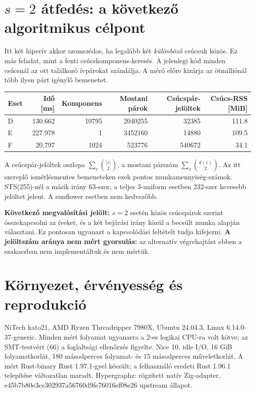 \documentclass[10pt,a4paper]{article}
\begin{document}
\section*{$s=2$ átfedés: a következő algoritmikus célpont}
Itt két hiperív akkor szomszédos, ha legalább két \emph{különböző} csúcsuk közös.
Ez más feladat, mint a fenti csúcskomponens-keresés. A jelenlegi kód minden csúcsnál
az ott találkozó ívpárokat számlálja. A mérő előre kizárja az ötmilliónál több ilyen
párt igénylő bemenetet.
\begin{center}\begin{tabular}{lrrrrr}\toprule
Eset & Idő [ms] & Komponens & Mostani párok & Csúcspár-jelöltek & Csúcs-RSS [MiB]\\\midrule
D & 130.662 & 10795 & 2040255 & 32385 & 111.8 \\
E & 227.978 & 1 & 3452160 & 14880 & 109.5 \\
F & 20.797 & 1024 & 523776 & 540672 & 34.1 \\
\bottomrule\end{tabular}\end{center}
A csúcspár-jelöltek oszlopa $\sum_e\binom{|e|}{2}$, a mostani párszám
$\sum_v\binom{d(v)}{2}$. Az itt szereplő ismétlésmentes bemeneteken ezek pontos
munkamennyiség-számok. STS(255)-nél a másik irány 63-szor, a teljes 3-uniform
esetben 232-szer kevesebb jelöltet jelent. A sunflower esetben nem kedvezőbb.

\textbf{Következő megvalósítási jelölt:} $s=2$ esetén közös csúcspárok szerint
összekapcsolni az íveket, és a két bejárási irány közül a becsült munka alapján
választani. Ez pontosan ugyanazt a kapcsolódási feltételt tudja kifejezni.
\textbf{A jelöltszám aránya nem mért gyorsulás:} az alternatív végrehajtást ebben
a szakaszban nem implementáltuk és nem mértük.

\newpage\section*{Környezet, érvényesség és reprodukció}
NiTech kato21, AMD Ryzen Threadripper 7980X, Ubuntu 24.04.3, Linux
6.14.0-37-generic. Minden mért folyamat ugyanarra a 2-es logikai CPU-ra volt kötve;
az SMT-testvért (66) a foglaltsági ellenőrzés figyelte. Nice 10, idle I/O,
16 GiB folyamatkorlát, 180 másodperces folyamat- és 15 másodperces műveletkorlát.
A mért Rust-binary Rust 1.97.1-gyel készült; a felhasználó eredeti Rust 1.96.1
telepítése változatlan maradt. Hypergraphz: rögzített natív Zig-adapter,
e45b7b80e3ce302937a56760d9fe76016ef08e26 upstream állapot.
\end{document}
